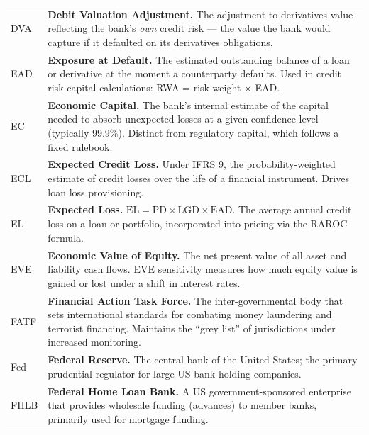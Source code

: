 \documentclass[12pt,a4paper]{article}
\begin{document}
\begin{longtable}{p{3.2cm} p{10.8cm}}
  DVA   & \textbf{Debit Valuation Adjustment.}
          The adjustment to derivatives value reflecting the bank's \emph{own}
          credit risk --- the value the bank would capture if it defaulted on
          its derivatives obligations. \\[4pt]

  EAD   & \textbf{Exposure at Default.}
          The estimated outstanding balance of a loan or derivative at the
          moment a counterparty defaults.  Used in credit risk capital
          calculations: RWA = risk weight $\times$ EAD. \\[4pt]

  EC    & \textbf{Economic Capital.}
          The bank's internal estimate of the capital needed to absorb
          unexpected losses at a given confidence level (typically 99.9\%).
          Distinct from regulatory capital, which follows a fixed rulebook. \\[4pt]

  ECL   & \textbf{Expected Credit Loss.}
          Under IFRS 9, the probability-weighted estimate of credit losses
          over the life of a financial instrument.  Drives loan loss
          provisioning. \\[4pt]

  EL    & \textbf{Expected Loss.}
          $\text{EL} = \text{PD} \times \text{LGD} \times \text{EAD}$.
          The average annual credit loss on a loan or portfolio, incorporated
          into pricing via the RAROC formula. \\[4pt]

  EVE   & \textbf{Economic Value of Equity.}
          The net present value of all asset and liability cash flows.
          EVE sensitivity measures how much equity value is gained or lost
          under a shift in interest rates. \\[4pt]

  FATF  & \textbf{Financial Action Task Force.}
          The inter-governmental body that sets international standards
          for combating money laundering and terrorist financing.
          Maintains the ``grey list'' of jurisdictions under increased
          monitoring. \\[4pt]

  Fed   & \textbf{Federal Reserve.}
          The central bank of the United States; the primary prudential
          regulator for large US bank holding companies. \\[4pt]

  FHLB  & \textbf{Federal Home Loan Bank.}
          A US government-sponsored enterprise that provides wholesale
          funding (advances) to member banks, primarily used for mortgage
          funding. \\[4pt]


\end{longtable}
\end{document}
